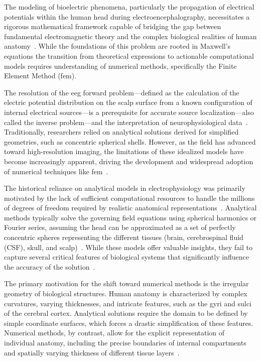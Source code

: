 The modeling of bioelectric phenomena, particularly the propagation of electrical potentials within the human head during electroencephalography, necessitates a rigorous mathematical framework capable of bridging the gap between fundamental electromagnetic theory and the complex biological realities of human anatomy~\cite{bauer-2015, vatta-2010}. While the foundations of this problem are rooted in Maxwell’s equations the transition from theoretical expressions to actionable computational models requires understanding of numerical methods, specifically the Finite Element Method (\gls{fem}).

The resolution of the \gls{eeg} forward problem—defined as the calculation of the electric potential distribution on the scalp surface from a known configuration of internal electrical sources—is a prerequisite for accurate source localization---also called the inverse problem---and the interpretation of neurophysiological data~\cite{dayarian-2024, hallez-2007,  erdbrugger-2023}. Traditionally, researchers relied on analytical solutions derived for simplified geometries, such as concentric spherical shells. However, as the field has advanced toward high-resolution imaging, the limitations of these idealized models have become increasingly apparent, driving the development and widespread adoption of numerical techniques like \gls{fem}~\cite{vatta-2010, hallez-2007}.

The historical reliance on analytical models in electrophysiology was primarily motivated by the lack of sufficient computational resources to handle the millions of degrees of freedom required by realistic anatomical representations~\cite{vatta-2010}. Analytical methods typically solve the governing field equations using spherical harmonics or Fourier series, assuming the head can be approximated as a set of perfectly concentric spheres representing the different tissues (brain, cerebrospinal fluid (CSF), skull, and scalp)~\cite{vatta-2010, nss-2017}. While these models offer valuable insights, they fail to capture several critical features of biological systems that significantly influence the accuracy of the solution~\cite{nss-2017}.

The primary motivation for the shift toward numerical methods is the irregular geometry of biological structures. Human anatomy is characterized by complex curvatures, varying thicknesses, and intricate features, such as the gyri and sulci of the cerebral cortex. Analytical solutions require the domain to be defined by simple coordinate surfaces, which forces a drastic simplification of these features. Numerical methods, by contrast, allow for the explicit representation of individual anatomy, including the precise boundaries of internal compartments and spatially varying thickness of different tissue layers~\cite{hallez-2007, vatta-2010}.


